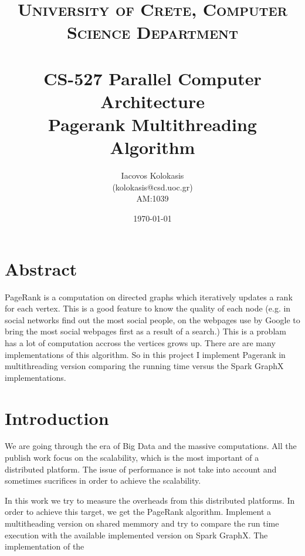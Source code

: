 \documentclass[paper=a4, fontsize=11pt]{scrartcl} %
\title{	
\normalfont \normalsize 
\textsc{University of Crete, Computer Science Department} \\ [25pt] %
\horrule{0.5pt} \\[0.4cm] %
\huge CS-527 Parallel Computer Architecture \\ 
Pagerank Multithreading Algorithm %
\horrule{2pt} \\[0.5cm] %
}
\author{Iacovos Kolokasis \\(kolokasis@csd.uoc.gr) \\AM:1039} %
\date{\normalsize\today} %
\numberwithin{equation}{section} %
\numberwithin{figure}{section} %
\numberwithin{table}{section} %
\begin{document}
\maketitle %


\section{Abstract}

PageRank is a computation on directed graphs which iteratively updates a rank
for each vertex. This is a good feature to know the quality of each node (e.g.
in social networks find out the most social people, on the webpages use by
Google to bring the most social webpages first as a result of a search.) This is
a problam has a lot of computation accross the vertices grows up. There are are
many implementations of this algorithm. So in this project I implement Pagerank
in multithreading version comparing the running time versus the Spark GraphX
implementations. %



\section{Introduction}

We are going through the era of Big Data and the massive computations. All the
publish work focus on the scalability, which is the most important of a
distributed platform. The issue of performance is not take into account and
sometimes sucrifices in order to achieve the scalability.

In this work we try to measure the overheads from this distributed platforms.
In order to achieve this target, we get the PageRank algorithm. Implement a
multitheading version on shared memmory and try to compare the run time
execution with the available implemented version on Spark GraphX. The
implementation of the 





\end{document}
